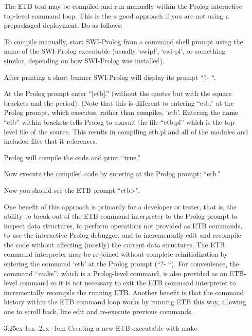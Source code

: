 \documentclass[12pt,twoside,a4paper]{article}
\makeatletter
\renewcommand\paragraph{\@startsection{paragraph}{5}{\z@}%
  {3.25ex \@plus1ex \@minus.2ex}%
  {-1em}%
  {\normalfont\normalsize\bfseries}}
\makeatother
\begin{document}
The ETB tool may be compiled and run manually within the Prolog interactive top-level command loop. This is the a good approach if you are not using a prepackaged deployment. Do as follows:

To compile manually, start SWI-Prolog from a command shell prompt using the name of the SWI-Prolog executable (usually `swipl', `swi-pl', or something similar, depending on how SWI-Prolog was installed).

After printing a short banner SWI-Prolog will display its prompt ``?- ``.

At the Prolog prompt enter ``{[}etb{]}.'' (without the quotes but with the square brackets and the period). (Note that this is different to entering ``etb.'' at the Prolog prompt, which executes, rather than compiles, `etb'. Entering the name ``etb'' within brackets tells Prolog to consult the file ``etb.pl'' which is the top-level file of the source. This results in compiling etb.pl and all of the modules and included files that it references.

Prolog will compile the code and print ``true.''

Now execute the compiled code by entering at the Prolog prompt: ``etb.''

Now you should see the ETB prompt ``etb\textgreater''.

One benefit of this approach is primarily for a developer or tester, that is, the ability to break out of the ETB command interpreter to the Prolog prompt to inspect data structures, to perform operations not provided as ETB commands, to use the interactive Prolog debugger, and to incrementally edit and recompile the code without affecting (mostly) the current data structures. The ETB command interpreter may be re-joined without complete reinitialization by entering the command `etb' at the Prolog prompt (``?- ``). For convenience, the command ``make'', which is a Prolog-level command, is also provided as an ETB-level command so it is not necessary to exit the ETB command interpreter to incrementally recompile the running ETB. Another benefit is that the command history within the ETB command loop works by running ETB this way, allowing one to scroll back, line edit and re-execute previous commands.

\hypertarget{creating-a-new-etb-executable-with-make}{%
\paragraph{Creating a new ETB executable with make}\label{creating-a-new-etb-executable-with-make}}
\end{document}
